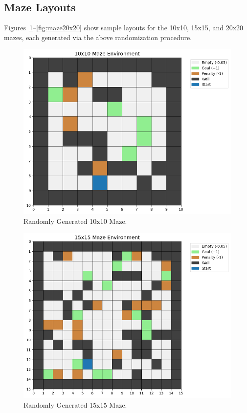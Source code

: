 \documentclass[11pt]{article}
\begin{document}
\newpage
\subsection{Maze Layouts}
Figures~\ref{fig:maze10x10}--\ref{fig:maze20x20} show sample layouts for the 10x10, 15x15, and 20x20 mazes, each generated via the above randomization procedure. 

\begin{figure}[H]
    \centering
    \includegraphics[width=\textwidth]{maze_10x10_environment.png}
    \caption{Randomly Generated 10x10 Maze.}
    \label{fig:maze10x10}
\end{figure}

\begin{figure}[H]
    \centering
    \includegraphics[width=\textwidth]{maze_15x15_environment.png}
    \caption{Randomly Generated 15x15 Maze.}
    \label{fig:maze15x15}
\end{figure}
\end{document}
